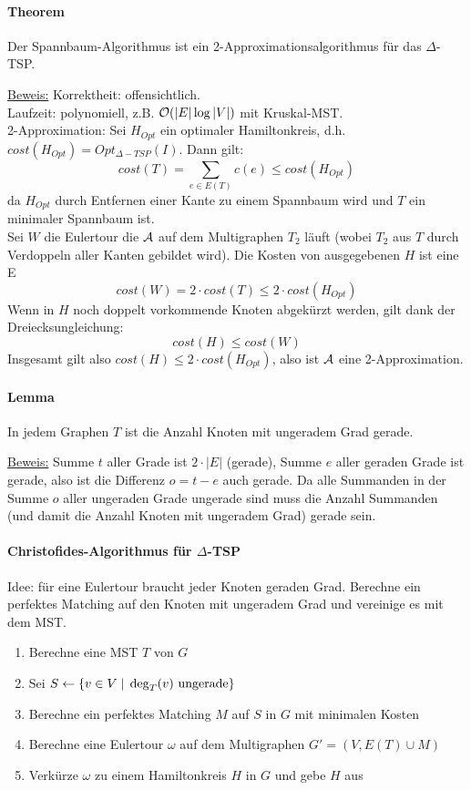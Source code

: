 \paragraph{Theorem}
Der Spannbaum-Algorithmus ist ein 2-Approximationsalgorithmus für das $\Delta$-TSP.

\underline{Beweis:}
Korrektheit: offensichtlich. \\
Laufzeit: polynomiell, z.B. $\mathcal{O}(|E| \log|V|)$ mit Kruskal-MST. \\
2-Approximation:
Sei $H_{Opt}$ ein optimaler Hamiltonkreis, d.h. $cost(H_{Opt}) = Opt_{\Delta-TSP}(I)$.
Dann gilt:
$$ cost(T) = \sum_{e \in E(T)} c(e) \leq cost(H_{Opt}) $$
da $H_{Opt}$ durch Entfernen einer Kante zu einem Spannbaum wird und $T$ ein minimaler Spannbaum ist.
\\
Sei $W$ die Eulertour die $\mathcal{A}$ auf dem Multigraphen $T_2$ läuft
(wobei $T_2$ aus $T$ durch Verdoppeln aller Kanten gebildet wird).
Die Kosten von ausgegebenen $H$ ist eine E
$$ cost(W) = 2 \cdot cost(T) \leq 2 \cdot cost(H_{Opt}) $$
Wenn in $H$ noch doppelt vorkommende Knoten abgekürzt werden, gilt dank der Dreiecksungleichung:
$$ cost(H) \leq cost(W) $$
Insgesamt gilt also $ cost(H) \leq 2 \cdot cost(H_{Opt})$, also ist $\mathcal{A}$ eine 2-Approximation.

\paragraph{Lemma}
In jedem Graphen $T$ ist die Anzahl Knoten mit ungeradem Grad gerade.

\underline{Beweis:}
Summe $t$ aller Grade ist $2 \cdot |E|$ (gerade), Summe $e$ aller geraden Grade ist gerade, also ist
die Differenz $o=t-e$ auch gerade.
Da alle Summanden in der Summe $o$ aller ungeraden Grade ungerade sind muss die Anzahl Summanden
(und damit die Anzahl Knoten mit ungeradem Grad) gerade sein.

\paragraph{Christofides-Algorithmus für $\Delta$-TSP}
Idee: für eine Eulertour braucht jeder Knoten geraden Grad.
Berechne ein perfektes Matching auf den Knoten mit ungeradem Grad und vereinige es mit dem MST.
\begin{enumerate}
    \item Berechne eine MST $T$ von $G$
    \item Sei $S \leftarrow \{ v \in V \; | \; \deg_T(v) \text{ ungerade} \}$
    \item Berechne ein perfektes Matching $M$ auf $S$ in $G$ mit minimalen Kosten
    \item Berechne eine Eulertour $\omega$ auf dem Multigraphen $G' = (V, E(T) \cup M)$
    \item Verkürze $\omega$ zu einem Hamiltonkreis $H$ in $G$ und gebe $H$ aus
\end{enumerate}

